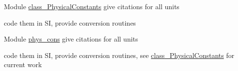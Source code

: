 \label{todo__todo000001}
\hypertarget{todo__todo000001}{}
 
\begin{DoxyDescription}
\item[Module \hyperlink{namespaceclass__PhysicalConstants}{class\_\-PhysicalConstants} ]give citations for all units 

code them in SI, provide conversion routines 
\end{DoxyDescription}

\label{todo__todo000002}
\hypertarget{todo__todo000002}{}
 
\begin{DoxyDescription}
\item[Module \hyperlink{namespacephys__cons}{phys\_\-cons} ]give citations for all units 

code them in SI, provide conversion routines, see \hyperlink{namespaceclass__PhysicalConstants}{class\_\-PhysicalConstants} for current work 
\end{DoxyDescription}